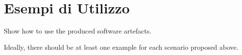\section{Esempi di Utilizzo}

Show how to use the produced software artefacts.

Ideally, there should be at least one example for each scenario proposed above.